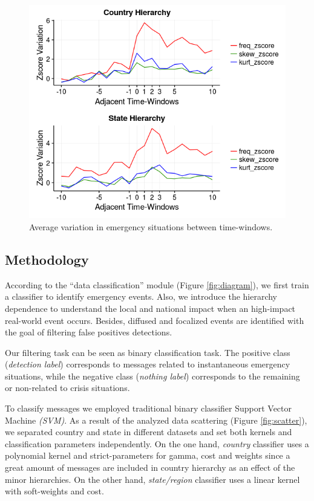 \documentclass[sigconf]{acmart}
\begin{document}
\begin{figure}
	\centering
	\includegraphics[width=\columnwidth]{img/labeled2.png}
	\caption{Average variation in emergency situations between time-windows.}
	\label{fig:labeled}
\end{figure}



\subsection{Methodology}\label{sec:methodology}

According to the ``data classification'' module (Figure \ref{fig:diagram}), we first train a classifier to identify emergency events. Also, we introduce the hierarchy dependence to understand the local and national impact when an high-impact real-world event occurs. Besides, diffused and focalized events are identified with the goal of filtering false positives detections.

Our filtering task can be seen as binary classification task. The positive class (\textit{detection label}) corresponds to messages related to instantaneous emergency situations, while the negative class (\textit{nothing label}) corresponds to the remaining or non-related to crisis situations.

To classify messages we employed traditional binary classifier Support Vector Machine \textit{(SVM)}. As a result of the analyzed data scattering (Figure \ref{fig:scatter}), we separated country and state in different datasets and set both kernels and classification parameters independently. On the one hand, \textit{country} classifier uses a polynomial kernel and strict-parameters for gamma, cost and weights since a great amount of messages are included in country hierarchy as an effect of the minor hierarchies. On the other hand, \textit{state/region} classifier uses a linear kernel with soft-weights and cost.
\end{document}
